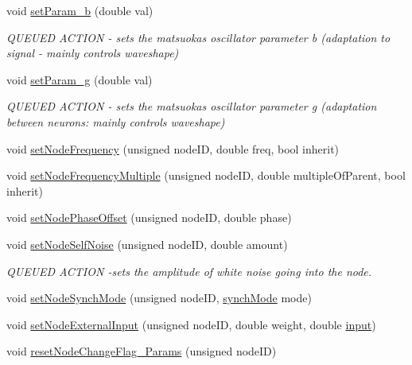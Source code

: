 \begin{DoxyCompactItemize}
void \mbox{\hyperlink{classMatsuokaEngine_aa568d548269415a9104a74eaec19d958}{set\+Param\+\_\+b}} (double val)
\begin{DoxyCompactList}\small\item\em Q\+U\+E\+U\+ED A\+C\+T\+I\+ON -\/ sets the matsuoka\textquotesingle{}s oscillator parameter b (adaptation to signal -\/ mainly controls waveshape) \end{DoxyCompactList}\item 
void \mbox{\hyperlink{classMatsuokaEngine_aba4ab083a57717c7dba5d75ff3d1987a}{set\+Param\+\_\+g}} (double val)
\begin{DoxyCompactList}\small\item\em Q\+U\+E\+U\+ED A\+C\+T\+I\+ON -\/ sets the matsuoka\textquotesingle{}s oscillator parameter g (adaptation between neurons\+: mainly controls waveshape) \end{DoxyCompactList}\item 
void \mbox{\hyperlink{classMatsuokaEngine_acd76608c9b7fb30bf9e0ed2ecd1ba40a}{set\+Node\+Frequency}} (unsigned node\+ID, double freq, bool inherit)
\item 
void \mbox{\hyperlink{classMatsuokaEngine_a304bbae799a46734b1db0ac679f032e4}{set\+Node\+Frequency\+Multiple}} (unsigned node\+ID, double multiple\+Of\+Parent, bool inherit)
\item 
void \mbox{\hyperlink{classMatsuokaEngine_a858deaa3246c884cc0693b494e398849}{set\+Node\+Phase\+Offset}} (unsigned node\+ID, double phase)
\item 
void \mbox{\hyperlink{classMatsuokaEngine_a4e564e80779a3cd89cb3d4347920ba7d}{set\+Node\+Self\+Noise}} (unsigned node\+ID, double amount)
\begin{DoxyCompactList}\small\item\em Q\+U\+E\+U\+ED A\+C\+T\+I\+ON -\/sets the amplitude of white noise going into the node. \end{DoxyCompactList}\item 
void \mbox{\hyperlink{classMatsuokaEngine_aa037d1bcb48e395ef6e789feab20b144}{set\+Node\+Synch\+Mode}} (unsigned node\+ID, \mbox{\hyperlink{classMatsuNode_a725e228db39b8842f851ddf88f640bed}{synch\+Mode}} mode)
\item 
void \mbox{\hyperlink{classMatsuokaEngine_a8eb38eaa5de05677243c5c7cd809af4d}{set\+Node\+External\+Input}} (unsigned node\+ID, double weight, double \mbox{\hyperlink{classMatsuokaEngine_a811a5449f07004a2eb6b34e8c9bd862f}{input}})
\item 
void \mbox{\hyperlink{classMatsuokaEngine_afc55b8350937748e0c0187a08130ca31}{reset\+Node\+Change\+Flag\+\_\+\+Params}} (unsigned node\+ID)

\end{DoxyCompactItemize}
